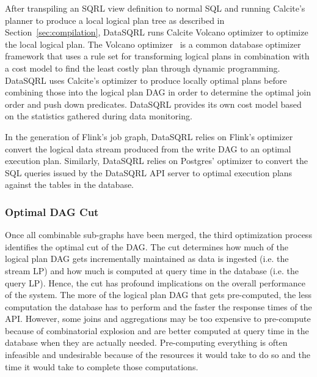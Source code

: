 \documentclass[	DIV=calc,%
							paper=letter,%
							fontsize=11pt,%
							twocolumn]{scrartcl}	 					%
\begin{document}
After transpiling an SQRL view definition to normal SQL and running Calcite's planner to produce a local logical plan tree as described in Section~\ref{sec:compilation}, DataSQRL runs Calcite Volcano optimizer to optimize the local logical plan. The Volcano optimizer~\cite{volcano, cascade} is a common database optimizer framework that uses a rule set for transforming logical plans in combination with a cost model to find the least costly plan through dynamic programming. DataSQRL uses Calcite's optimizer to produce locally optimal plans before combining those into the logical plan DAG in order to determine the optimal join order and push down predicates. DataSQRL provides its own cost model based on the statistics gathered during data monitoring.

In the generation of Flink's job graph, DataSQRL relies on Flink's optimizer convert the logical data stream produced from the write DAG to an optimal execution plan. Similarly, DataSQRL relies on Postgres' optimizer to convert the SQL queries issued by the DataSQRL API server to optimal execution plans against the tables in the database.

\subsubsection{Optimal DAG Cut}
\label{sec:dag_cut_opt}

Once all combinable sub-graphs have been merged, the third optimization process identifies the optimal cut of the DAG. The cut determines how much of the logical plan DAG gets incrementally maintained as data is ingested (i.e. the stream LP) and how much is computed at query time in the database (i.e. the query LP). Hence, the cut has profound implications on the overall performance of the system. The more of the logical plan DAG that gets pre-computed, the less computation the database has to perform and the faster the response times of the API. However, some joins and aggregations may be too expensive to pre-compute because of combinatorial explosion and are better computed at query time in the database when they are actually needed. Pre-computing everything is often infeasible and undesirable because of the resources it would take to do so and the time it would take to complete those computations.
\end{document}

